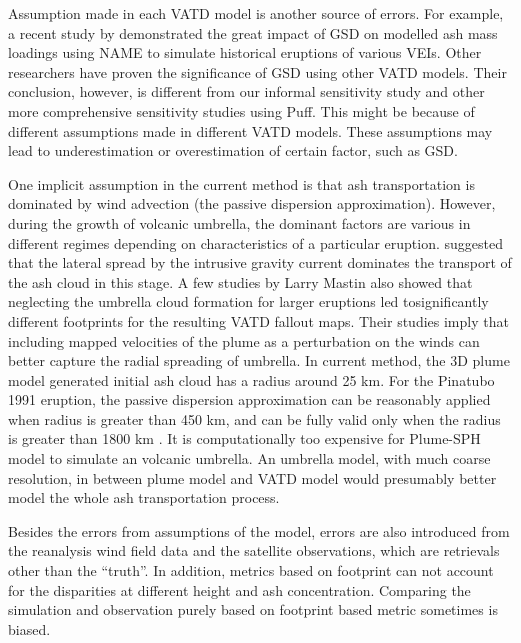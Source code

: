 \documentclass[utf8]{frontiersSCNS} %
\begin{document}
Assumption made in each VATD model is another source of errors. For example, a recent study by \citet{osman2020sensitivity} demonstrated the great impact of GSD on modelled ash mass loadings using NAME\citep{jones2007uk} to simulate historical eruptions of various VEIs. Other researchers \citep{beckett2015sensitivity,scollo2008parametric} have proven the significance of GSD using other VATD models. Their conclusion, however, is different from our informal sensitivity study and other more comprehensive sensitivity studies using Puff. This might be because of different assumptions made in different VATD models. These assumptions may lead to underestimation or overestimation of certain factor, such as GSD.

One implicit assumption in the current method is that ash transportation is dominated by wind advection (the passive dispersion approximation). However, during the growth of volcanic umbrella, the dominant factors are various in different regimes \citep{pouget2016interpretation} depending on characteristics of a particular eruption. \citet{webster2020operational} suggested that the lateral spread by the intrusive gravity current dominates the transport of the ash cloud in this stage. A few studies by Larry Mastin \citep{mastin2014modeling,mastin2020comparing} also showed that neglecting the umbrella cloud formation for larger eruptions led tosignificantly different footprints for the resulting VATD fallout maps. Their studies imply that including mapped velocities of the plume as a perturbation on the winds can better capture the radial spreading of umbrella. In current method, the 3D plume model generated initial ash cloud has a radius around 25 km. For the Pinatubo 1991 eruption, the passive dispersion approximation can be reasonably applied when radius is greater than 450 km, and can be fully valid only when the radius is greater than 1800 km \citep{costa2013density}. It is computationally too expensive for Plume-SPH model to simulate an volcanic umbrella. An umbrella model, with much coarse resolution, in between plume model and VATD model would presumably better model the whole ash transportation process.

Besides the errors from assumptions of the model, errors are also introduced from the reanalysis wind field data and the satellite observations, which are retrievals other than the ``truth”. In addition, metrics based on footprint can not account for the disparities at different height and ash concentration. Comparing the simulation and observation purely based on footprint based metric sometimes is biased.
\end{document}
